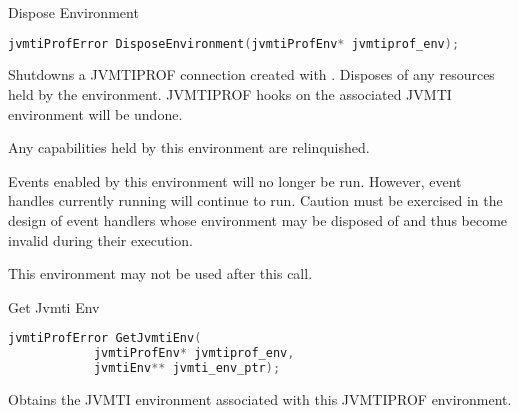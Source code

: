 \begin{apidef}{Dispose Environment}
\begin{lstlisting}[language=C]
jvmtiProfError DisposeEnvironment(jvmtiProfEnv* jvmtiprof_env);
\end{lstlisting}

\begin{apidesc}
Shutdowns a JVMTIPROF connection created with . Disposes of any resources held by the environment. JVMTIPROF hooks on the associated JVMTI environment will be undone.

\medskip
Any capabilities held by this environment are relinquished.

\medskip
Events enabled by this environment will no longer be run. However, event handles currently running will continue to run. Caution must be exercised in the design of event handlers whose environment may be disposed of and thus become invalid during their execution.

\medskip
This environment may not be used after this call.
\end{apidesc}

\begin{apiphase}
\apiphaseany
\end{apiphase}

\begin{apicap}
\apicaprequired
\end{apicap}

\apiparamempty

\apierrorempty
\end{apidef}
\begin{apidef}{Get Jvmti Env}
\begin{lstlisting}[language=C]
jvmtiProfError GetJvmtiEnv(
            jvmtiProfEnv* jvmtiprof_env,
            jvmtiEnv** jvmti_env_ptr);
\end{lstlisting}

\begin{apidesc}
Obtains the JVMTI environment associated with this JVMTIPROF environment.
\end{apidesc}

\begin{apiphase}
\apiphaseany
\end{apiphase}

\begin{apicap}
\apicaprequired
\end{apicap}

\begin{apiparam}
\end{apiparam}

\begin{apierror}
\end{apierror}
\end{apidef}
